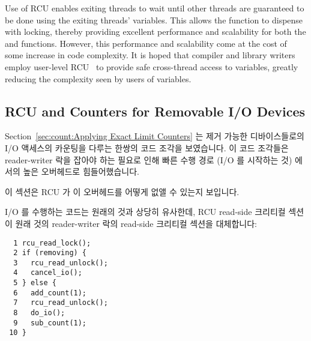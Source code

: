 Use of RCU enables exiting threads to wait until other threads are
guaranteed to be done using the exiting threads'  variables.
This allows the  function to dispense with locking,
thereby providing
excellent performance and scalability for both the 
and  functions.
However, this performance and scalability come at the cost of some increase
in code complexity.
It is hoped that compiler and library writers employ user-level
RCU~\cite{MathieuDesnoyers2009URCU} to provide safe cross-thread
access to  variables, greatly reducing the
complexity seen by users of  variables.
\fi

\subsection{RCU and Counters for Removable I/O Devices}
\label{sec:together:RCU and Counters for Removable I/O Devices}

Section~\ref{sec:count:Applying Exact Limit Counters}
는 제거 가능한 디바이스들로의 I/O 액세스의 카운팅을 다루는 한쌍의 코드 조각을
보였습니다.
이 코드 조각들은 reader-writer 락을 잡아야 하는 필요로 인해 빠른 수행 경로 (I/O
를 시작하는 것) 에서의 높은 오버헤드로 힘들어했습니다.

이 섹션은 RCU 가 이 오버헤드를 어떻게 없앨 수 있는지 보입니다.

I/O 를 수행하는 코드는 원래의 것과 상당히 유사한데, RCU read-side 크리티컬
섹션이 원래 것의 reader-writer 락의 read-side 크리티컬 섹션을 대체합니다:
\iffalse

Section~\ref{sec:count:Applying Exact Limit Counters}
showed a fanciful pair of code fragments for dealing with counting
I/O accesses to removable devices.
These code fragments suffered from high overhead on the fastpath
(starting an I/O) due to the need to acquire a reader-writer
lock.

This section shows how RCU may be used to avoid this overhead.

The code for performing an I/O is quite similar to the original, with
an RCU read-side critical section being substituted for the reader-writer
lock read-side critical section in the original:
\fi

\vspace{5pt}
\begin{minipage}[t]{\columnwidth}
\small
\begin{verbatim}
  1 rcu_read_lock();
  2 if (removing) {
  3   rcu_read_unlock();
  4   cancel_io();
  5 } else {
  6   add_count(1);
  7   rcu_read_unlock();
  8   do_io();
  9   sub_count(1);
 10 }
\end{verbatim}
\end{minipage}
\vspace{5pt}


